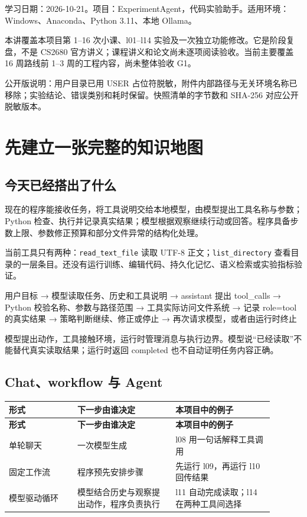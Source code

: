
学习日期：2026-10-21。项目：ExperimentAgent，代码实验助手。适用环境：Windows、Anaconda、Python 3.11、本地 Ollama。

本讲覆盖本项目第 1–16 次小课、l01–l14 实验及一次独立功能修改。它是阶段复盘，不是 CS2680 官方讲义；课程讲义和论文尚未逐项阅读验收。当前主要覆盖 16 周路线前 1–3 周的工程内容，尚未整体验收 G1。

公开版说明：用户目录已用 USER 占位符脱敏，附件内部路径与无关环境名称已移除；实验结论、错误类别和耗时保留。快照清单的字节数和 SHA-256 对应公开脱敏版本。

\section{先建立一张完整的知识地图}

\subsection{今天已经搭出了什么}

现在的程序能接收任务，将工具说明交给本地模型，由模型提出工具名称与参数；Python 检查、执行并记录真实结果；模型根据观察继续行动或回答。程序具备步数上限、参数修正预算和部分文件异常的结构化处理。

当前工具只有两种：\nolinkurl{read_text_file} 读取 UTF-8 正文；\nolinkurl{list_directory} 查看目录的一层条目。还没有运行训练、编辑代码、持久化记忆、语义检索或实验指标验证。

\begin{Code}
用户目标
  → 模型读取任务、历史和工具说明
  → assistant 提出 tool_calls
  → Python 校验名称、参数与路径范围
  → 工具实际访问文件系统
  → 记录 role=tool 的真实结果
  → 策略判断继续、修正或停止
  → 再次请求模型，或者由运行时终止
\end{Code}

模型提出动作，工具接触环境，运行时管理消息与执行边界。模型说“已经读取”不能替代真实读取结果；运行时返回 completed 也不自动证明任务内容正确。

\subsection{Chat、workflow 与 Agent}

{\small\setlength{\tabcolsep}{4pt}
\renewcommand{\arraystretch}{1.25}
\begin{longtable}{>{\raggedright\arraybackslash}p{0.23\linewidth}>{\raggedright\arraybackslash}p{0.33\linewidth}>{\raggedright\arraybackslash}p{0.33\linewidth}}
\toprule
\textbf{形式} & \textbf{下一步由谁决定} & \textbf{本项目中的例子} \\
\midrule\endfirsthead
\toprule
\textbf{形式} & \textbf{下一步由谁决定} & \textbf{本项目中的例子} \\
\midrule\endhead
\bottomrule\endfoot
单轮聊天 & 一次模型生成 & l08 用一句话解释工具调用 \\
固定工作流 & 程序预先安排步骤 & 先运行 l09，再运行 l10 回传结果 \\
模型驱动循环 & 模型结合历史与观察提出动作，程序负责执行 & l11 自动完成读取；l14 在两种工具间选择 \\
\end{longtable}}

